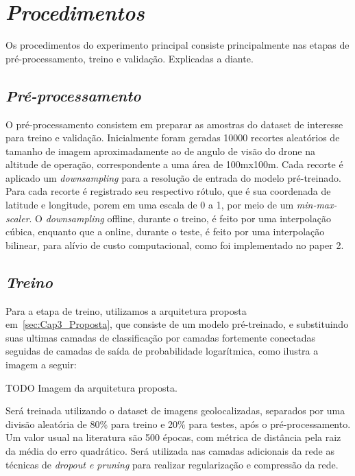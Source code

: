     

\section{\textit{Procedimentos}}\label{sec:Cap3_Procedimentos}

Os procedimentos do experimento principal consiste principalmente nas etapas de 
pré-processamento, treino e validação. Explicadas a diante.

\subsection{\textit{Pré-processamento}}\label{sec:Cap3_PreProcess}
O pré-processamento consistem em preparar as amostras do dataset de interesse para treino e validação. Inicialmente foram geradas 10000 recortes aleatórios de tamanho de imagem aproximadamente ao de angulo de visão do drone na altitude de operação, correspondente a uma área de 100mx100m. Cada recorte é aplicado um \textit{downsampling} para a resolução de entrada do modelo pré-treinado. Para cada recorte é registrado seu respectivo rótulo, que é sua coordenada de latitude e longitude, porem em uma escala de 0 a 1, por meio de um \textit{min-max-scaler}. O \textit{downsampling} offline, durante o treino, é feito por uma interpolação cúbica, enquanto que a online, durante o teste, é feito por uma interpolação bilinear, para alívio de custo computacional, como foi implementado no paper 2.

\subsection{\textit{Treino}}\label{sec:Cap3_Treino}
Para a etapa de treino, utilizamos a arquitetura proposta em~\ref{sec:Cap3_Proposta}, que consiste de um modelo pré-treinado, e substituindo suas ultimas camadas de classificação por camadas fortemente conectadas seguidas de camadas de saída de probabilidade logarítmica, como ilustra a imagem a seguir:


TODO Imagem da arquitetura proposta.

Será treinada utilizando o dataset de imagens geolocalizadas, separados por uma divisão aleatória de 80\% para treino e 20\% para testes, após o pré-processamento. Um valor usual na literatura são 500 épocas, com métrica de distância pela raiz da média do erro quadrático. Será utilizada nas camadas adicionais da rede as técnicas de \textit{dropout e pruning} para realizar regularização e compressão da rede.




